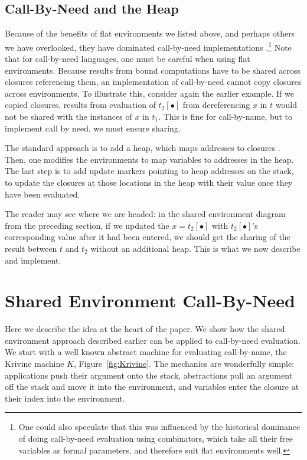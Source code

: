 \documentclass[preprint]{sigplanconf}
\begin{document}
\subsection{Call-By-Need and the Heap}

Because of the benefits of flat environments we listed above, and perhaps others we
have overlooked, they have dominated call-by-need implementations
\cite{jonesstg, TIM, johnsson1984efficient, boquist1997grin}.\footnote{One could
also speculate that this was influenced by the historical dominance of doing
call-by-need evaluation using combinators, which take all their free variables
as formal parameters, and therefore suit flat environments well.}
Note that
for call-by-need languages, one must be careful when using flat
environments.  Because results from bound computations have to be shared across
closures referencing them, an implementation of call-by-need cannot copy closures
across environments. To illustrate this, consider again the earlier example.
If we copied closures, results from evaluation of $t_2[\bullet]$ from
dereferencing $x$ in $t$ would not be shared with the instances of $x$ in $t_1$.
This is fine for call-by-name, but to implement call by need, we must ensure
sharing.

The standard approach is to add a heap, which maps addresses to closures
\cite{jonesstg, TIM, johnsson1984efficient, sestoft}. Then, one
modifies the environments to map variables to addresses in the heap. The last
step is to add update markers pointing to heap addresses on the stack, to update
the closures at those locations in the heap with their value once they have been
evaluated. 

The reader may see where we are headed: in the shared
environment diagram from the preceding section, if we updated the
$x=t_2[\bullet]$ with $t_2[\bullet]$'s corresponding value after it had been
entered, we should get the sharing of the result between $t$ and $t_2$ without
an additional heap. This is what we now describe and implement.

\section{Shared Environment Call-By-Need} \label{sec:calc}

Here we describe the idea at the heart of the paper. We show how
the shared environment approach described earlier can be applied to call-by-need
evaluation. We start with a well known abstract machine for evaluating
call-by-name, the Krivine machine $K$, Figure~\ref{fig:Krivine}.
The mechanics are wonderfully simple: applications push their argument
onto the stack, abstractions pull an argument off the stack and move it into the
environment, and variables enter the closure at their index into the
environment.
\end{document}
